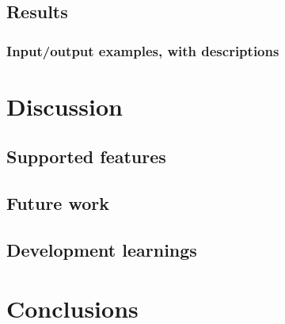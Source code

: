 \documentclass[nofilelist]{cslthse-msc}
\begin{document}
\section{Results} %
\subsection{Input/output examples, with descriptions}

\chapter{Discussion} %
\section{Supported features}
\section{Future work}
\section{Development learnings}

\chapter{Conclusions} %
\end{document}
